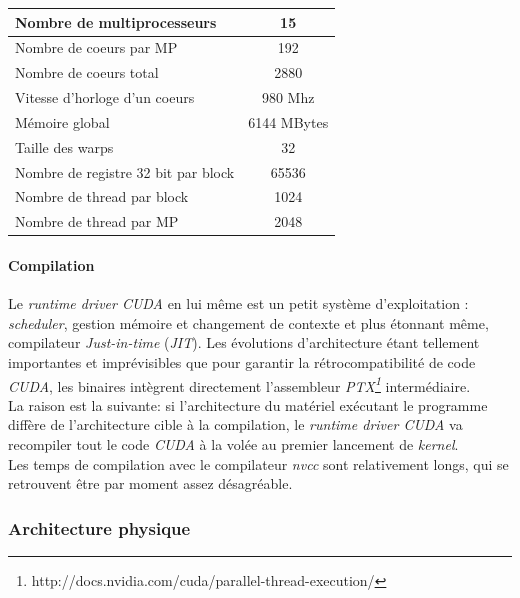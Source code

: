 \documentclass[french, 11pt]{memoir}
\begin{document}
\begin{center}
	\begin{tabular}{ |l| c| }
		\hline
Nombre de multiprocesseurs & 15 \\
			\hline
Nombre de coeurs par MP & 192\\
			\hline
Nombre de coeurs total & 2880\\
			\hline
Vitesse d'horloge d'un coeurs & 980 Mhz\\
			\hline
Mémoire global &  6144 MBytes\\
			\hline
Taille des warps & 32\\
			\hline
Nombre de registre 32 bit par block & 65536\\
			\hline
Nombre de thread par block & 1024\\
			\hline
Nombre de thread par MP & 2048\\
			\hline
	\end{tabular}

\end{center}


\paragraph{Compilation}\label{compilation}

Le \emph{runtime driver CUDA} en lui même est un petit système
d'exploitation : \emph{scheduler}, gestion mémoire et changement de
contexte et plus étonnant même, compilateur \emph{Just-in-time}
(\emph{JIT}). Les évolutions d'architecture étant tellement importantes
et imprévisibles que pour garantir la rétrocompatibilité de code
\emph{CUDA}, les binaires intègrent directement l'assembleur \textit{PTX\footnote{http://docs.nvidia.com/cuda/parallel-thread-execution/}}
intermédiaire.\\
La raison est la suivante: si l'architecture du matériel exécutant le
programme diffère de l'architecture cible à la compilation, le
\emph{runtime driver CUDA} va recompiler tout le code \textit{CUDA} à la volée
au premier lancement de \emph{kernel}. \\
Les temps de compilation avec le compilateur \textit{nvcc} sont relativement
longs, qui se retrouvent être par moment assez désagréable.


\subsubsection{Architecture physique}\label{architecture-physique}
\end{document}
